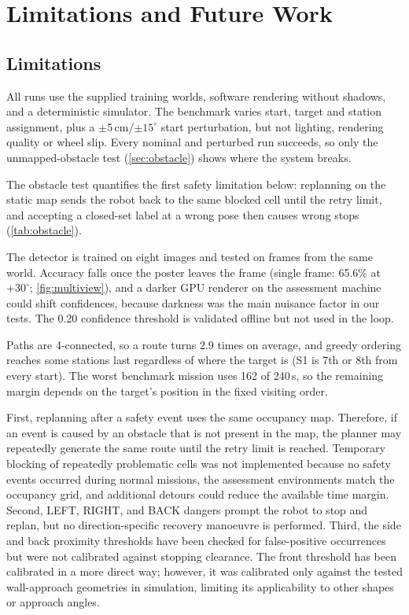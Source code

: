 \section{Limitations and Future Work}
\label{sec:discussion}

\subsection{Limitations}
 All runs use the supplied training worlds, software rendering without shadows, and a deterministic simulator. The benchmark varies start, target and station assignment, plus a $\pm$5\,cm/$\pm15^\circ$ start perturbation, but not lighting, rendering quality or wheel slip. Every nominal and perturbed run succeeds, so only the unmapped-obstacle test (\cref{sec:obstacle}) shows where the system breaks.

 The obstacle test quantifies the first safety limitation below: replanning on the static map sends the robot back to the same blocked cell until the retry limit, and accepting a closed-set label at a wrong pose then causes wrong stops (\cref{tab:obstacle}).

 The detector is trained on eight images and tested on frames from the same world. Accuracy falls once the poster leaves the frame (single frame: 65.6\% at $+30^\circ$; \cref{fig:multiview}), and a darker GPU renderer on the assessment machine could shift confidences, because darkness was the main nuisance factor in our tests. The 0.20 confidence threshold is validated offline but not used in the loop.

 Paths are 4-connected, so a route turns 2.9 times on average, and greedy ordering reaches some stations last regardless of where the target is (S1 is 7th or 8th from every start). The worst benchmark mission uses 162 of 240\,s, so the remaining margin depends on the target's position in the fixed visiting order.

First, replanning after a safety event uses the same occupancy map.
Therefore, if an event is caused by an obstacle that is not present in the map, the planner may repeatedly generate the same route until the retry limit is reached. 
Temporary blocking of repeatedly problematic cells was not implemented because no safety events occurred during normal missions, the assessment environments match the occupancy grid, and additional detours could reduce the available time margin.
Second, LEFT, RIGHT, and BACK dangers prompt the robot to stop and replan, but no direction-specific recovery manoeuvre is performed. 
Third, the side and back proximity thresholds have been checked for false-positive occurrences but were not calibrated against stopping clearance. 
The front threshold has been calibrated in a more direct way; however, it was calibrated only against the tested wall-approach geometries in simulation, limiting its applicability to other shapes or approach angles.

